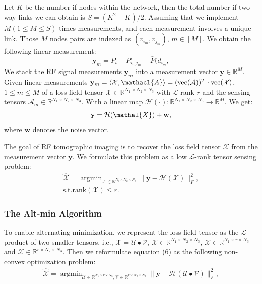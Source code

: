 \documentclass[journal,article,submit,moreauthors,pdftex,10pt,a4paper]{Definitions/mdpi}
\theoremstyle{plain}
\theoremstyle{definition}
\theoremstyle{remark}
\begin{document}
Let $K$ be the number if nodes within the network, then the total number if two-way links we can obtain is $S = (K^2 - K )/2$. Assuming that we implement $M(1 \leq M \leq S)$ times measurements, and each measurement involves a unique link. Those $M$ nodes pairs are indexed as $(v_{i_m}, v_{j_m})$, $m \in [M]$. We obtain the following linear measurement:
\begin{equation}
    \mathbf{y}_m = P_t - P_{i_mj_m} - \bar{P}(d_{i_m}, 
\end{equation}
We stack the RF signal measurements $\mathbf{y}_m$ into a measurement vector $\mathbf{y} \in \mathbb{R}^M$. Given linear measurements $\mathbf{y}_m = \langle \mathcal{X}, \mathacl{A} \rangle = (\text{vec}(\mathcal{A}))^T \cdot \text{vec}(\mathcal{X})$, $1 \leq m \leq M$ of a loss field tensor $\mathcal{X} \in \mathbb{R}^{N_1 \times N_2 \times N_3}$ with $\mathcal{L}$-rank $r$ and the sensing tensors $\mathcal{A}_m \in \mathbb{R}^{N_1 \times N_2 \times N_3}$. With a linear map $\mathcal{H}(\cdot):\mathbb{R}^{N_1 \times N_2 \times N_3} \to \mathbb{R}^M$. We get:
\begin{equation}
    \mathbf{y} = \mathcal{H}(\mathal{X}) + \mathbf{w},
\end{equation}
where $\mathbf{w}$ denotes the noise vector. 

The goal of RF tomographic imaging is to recover the loss field tensor $\mathcal{X}$ from the measurement vector $\mathbf{y}$. We formulate this problem as a low $\mathcal{L}$-rank tensor sensing problem:
\begin{eqnarray*}
    \widehat{\mathcal{X}} = \mathop{\arg\min}_{ \mathcal{X} \in \mathbb{R}^{N_1 \times N_2 \times N_3}}  \| \mathbf{y} - \mathcal{H}(\mathcal{X}) \|_F^2 , \\ \text{s.t.} \text{rank}(\mathcal{X}) \leq r .
\end{eqnarray*}
\unskip
\subsubsection{The Alt-min Algorithm}
To enable alternating minimization, we represent the loss field tensor as the $\mathcal{L}$-product of two smaller tensors, i.e., $\mathcal{X} = \mathcal{U} \bullet \mathcal{V}$, $\mathcal{X} \in \mathbb{R}^{N_1 \times N_2 \times N_3}$, $\mathcal{X} \in \mathbb{R}^{N_1 \times r \times N_3}$ and $\mathcal{X} \in \mathbb{R}^{r \times N_2 \times N_3}$.
Then we reformulate equation (6) as the following non-convex optimization problem:
\begin{eqnarray*}
    \widehat{\mathcal{X}} =
    \mathop{\arg\min}_{ \mathcal{U} \in \mathbb{R}^{N_1 \times r \times N_3}, \mathcal{V} \in \mathbb{R}^{r \times N_2 \times N_3}}\| \mathbf{y} - \mathcal{H}(\mathcal{U} \bullet \mathcal{V}) \|_F^2 , \\
\end{eqnarray*}
\end{document}
